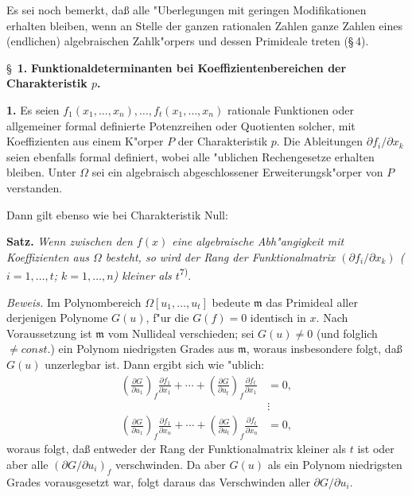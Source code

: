 Es sei noch bemerkt, da\ss{} alle "Uberlegungen mit geringen Modifikationen erhalten bleiben, wenn an Stelle der ganzen rationalen Zahlen ganze Zahlen eines (endlichen) algebraischen Zahlk"orpers und dessen Primideale treten (\S\,4).

\bigskip
\S~\textbf{1.}
\textbf{Funktionaldeterminanten bei Koeffizientenbereichen der Charakteristik $p$.}

\smallskip

\noindent\textbf{1.}
Es seien $f_1(x_1,\ldots,x_n),\ldots,f_t(x_1,\ldots,x_n)$ rationale Funktionen oder allgemeiner formal definierte Potenzreihen oder Quotienten solcher, mit Koeffizienten aus einem K"orper $P$ der Charakteristik $p$. Die Ableitungen $\partial f_i/\partial x_k$ seien ebenfalls formal definiert, wobei alle "ublichen Rechengesetze erhalten bleiben. Unter $\Omega$ sei ein algebraisch abgeschlossener Erweiterungsk"orper von $P$ verstanden.

Dann gilt ebenso wie bei Charakteristik Null:

\noindent\textbf{Satz.}
\textit{Wenn zwischen den $f(x)$ eine algebraische Abh"angigkeit mit Koeffizienten aus $\Omega$ besteht, so wird der Rang der Funktionalmatrix $(\partial f_i/\partial x_k)$ ($i=1,\ldots,t$; $k=1,\ldots,n$) kleiner als $t$}\textsuperscript{7)}.

\noindent\textit{Beweis.}
Im Polynombereich $\Omega[u_1,\ldots,u_t]$ bedeute $\mathfrak{m}$ das Primideal aller derjenigen Polynome $G(u)$, f"ur die $G(f) = 0$ identisch in $x$. Nach Voraussetzung ist $\mathfrak{m}$ vom Nullideal verschieden; sei $G(u) \neq 0$ (und folglich $\neq {const.}$) ein Polynom niedrigsten Grades aus $\mathfrak{m}$, woraus insbesondere folgt, da\ss{} $G(u)$ unzerlegbar ist. Dann ergibt sich wie "ublich:
\[
\begin{aligned}
\left(\frac{\partial G}{\partial u_1}\right)_{f}\frac{\partial f_1}{\partial x_1}
 +\cdots+
\left(\frac{\partial G}{\partial u_t}\right)_{f}\frac{\partial f_t}{\partial x_1}&=0,\\[-1mm]
&\vdots\\[-1mm]
\left(\frac{\partial G}{\partial u_1}\right)_{f}\frac{\partial f_1}{\partial x_n}
 +\cdots+
\left(\frac{\partial G}{\partial u_t}\right)_{f}\frac{\partial f_t}{\partial x_n}&=0,
\end{aligned}
\]
woraus folgt, da\ss{} entweder der Rang der Funktionalmatrix kleiner als $t$ ist oder aber alle $\left(\partial G/\partial u_i\right)_{f}$ verschwinden. Da aber $G(u)$ als ein Polynom niedrigsten Grades vorausgesetzt war, folgt daraus das Verschwinden aller $\partial G/\partial u_i$.

